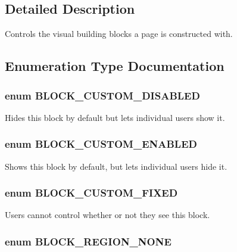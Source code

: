 \subsection{Detailed Description}
Controls the visual building blocks a page is constructed with. 

\subsection{Enumeration Type Documentation}
\hypertarget{block_8module_af07b678064998722cf22bdc158bac3cb}{
\subsubsection[{BLOCK\_\-CUSTOM\_\-DISABLED}]{\setlength{\rightskip}{0pt plus 5cm}enum {\bf BLOCK\_\-CUSTOM\_\-DISABLED}}}
\label{block_8module_af07b678064998722cf22bdc158bac3cb}
Hides this block by default but lets individual users show it. \hypertarget{block_8module_aaa995d4783ea11bc5a11649da4a07e63}{
\subsubsection[{BLOCK\_\-CUSTOM\_\-ENABLED}]{\setlength{\rightskip}{0pt plus 5cm}enum {\bf BLOCK\_\-CUSTOM\_\-ENABLED}}}
\label{block_8module_aaa995d4783ea11bc5a11649da4a07e63}
Shows this block by default, but lets individual users hide it. \hypertarget{block_8module_ae3e885cda347f368346eeb3ccdf52686}{
\subsubsection[{BLOCK\_\-CUSTOM\_\-FIXED}]{\setlength{\rightskip}{0pt plus 5cm}enum {\bf BLOCK\_\-CUSTOM\_\-FIXED}}}
\label{block_8module_ae3e885cda347f368346eeb3ccdf52686}
Users cannot control whether or not they see this block. \hypertarget{block_8module_a105ef421c8af1d72830a5a26f8a67169}{
\subsubsection[{BLOCK\_\-REGION\_\-NONE}]{\setlength{\rightskip}{0pt plus 5cm}enum {\bf BLOCK\_\-REGION\_\-NONE}}}
